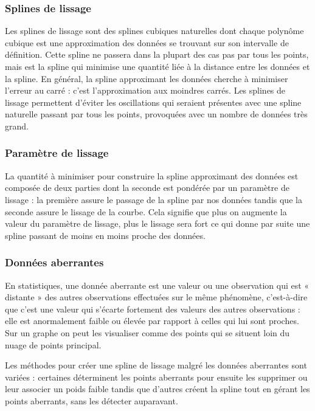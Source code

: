 \documentclass[a4paper,12pt]{article} %
\begin{document}
\subsubsection*{Splines de lissage}
Les splines de lissage sont des splines cubiques naturelles dont chaque polynôme cubique est une approximation des données se trouvant sur son intervalle de définition. Cette spline ne passera dans la plupart des cas pas par tous les points, mais est la spline qui minimise une quantité liée à la distance entre les données et la spline. En général, la spline approximant les données cherche à minimiser l'erreur au carré : c'est l'approximation aux moindres carrés. 
Les splines de lissage permettent d'éviter les oscillations qui seraient présentes avec une spline naturelle passant par tous les points, provoquées avec un nombre de données très grand.

\subsubsection*{Paramètre de lissage}
La quantité à minimiser pour construire la spline approximant des données est composée de deux parties dont la seconde est pondérée par un paramètre de lissage : la première assure le passage de la spline par nos données tandis que la seconde assure le lissage de la courbe. Cela signifie que plus on augmente la valeur du paramètre de lissage, plus le lissage sera fort ce qui donne par suite une spline passant de moins en moins proche des données.

\subsubsection*{Données aberrantes}

En statistiques, une donnée aberrante est une valeur ou une observation qui est « distante » des autres observations effectuées sur le même phénomène, c'est-à-dire que c’est une valeur qui s'écarte fortement des valeurs des autres observations : elle est anormalement faible ou élevée par rapport à celles qui lui sont proches. Sur un graphe on peut les visualiser comme des points qui se situent loin du nuage de points principal.

Les  méthodes pour créer une spline de lissage malgré les données aberrantes sont variées : certaines déterminent les points aberrants pour ensuite les supprimer ou leur associer un poids faible tandis que d'autres créent la spline tout en gérant les points aberrants, sans les détecter auparavant. 
\end{document}
